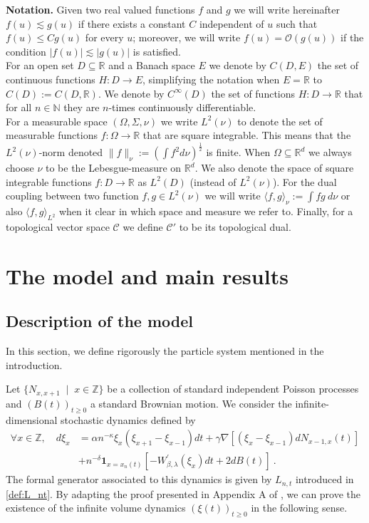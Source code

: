 \documentclass[a4paper, reqno, 12pt]{amsart}
\theoremstyle{plain}
\theoremstyle{definition}
\newcommand{\R}{\mathbb{R}}
\newcommand{\N}{\mathbb{N}}
\begin{document}
\bigskip
\textbf{Notation.} 
Given two real valued functions $f$ and $g$ we will write hereinafter $f(u) \lesssim g(u)$ if there exists a constant $C$ independent of $u$ such that $f(u) \le C g(u)$ for every $u$; moreover, we will write $f(u) = \mathcal{O} (g(u) )$ if the condition $|f (u) | \lesssim |g(u) |$ is satisfied. \\
For an open set $D\subseteq \R$ and a Banach space $E$ we denote by $C(D, E)$ the set of continuous functions $H:D\to E$, simplifying the notation when $E =\R$ to $C(D):= C(D,\R)$. We denote by $C^{\infty}(D)$ the set of  functions $H:D\to\R$ that for all $n\in\N$ they are $n$-times continuously differentiable.\\
For a measurable space $(\Omega , \Sigma, \nu)$ we  write $L^2(\nu)$ to denote the set of measurable functions $f:\Omega \to \R$ that are square integrable.
This means that the $L^2(\nu)$-norm denoted $\|f\|_{\nu}:=\left( \int f^2 d\nu\right)^{\frac{1}{2}}$ is finite. When $\Omega \subseteq \R^d$ we always choose $\nu$ to be the Lebesgue-measure on $\R^d$. We also denote the space of square integrable functions $f:D\to\R$ as $L^2(D)$ (instead of $L^2(\nu)$). For the dual coupling between two function $f,g\in L^2(\nu)$ we will write $\langle f,g\rangle_{\nu}:= \int fg \ d\nu$ or also $\langle f,g\rangle_{L^2}$ when it clear in which space and measure we refer to. 
Finally, for a topological vector space $\mathcal C$ we define $\mathcal C'$ to be its topological dual.



\section{The model and main results} \label{sec:modelandmainresults}

\subsection{Description of the model}


In this section, we define rigorously the particle system mentioned in the introduction. 


Let $\{ {N}_{x,x+1} \; \mid \; x \in \mathbb Z\}$ be a collection of standard independent Poisson processes and $(B(t))_{t \ge 0}$ a standard Brownian motion. We consider the infinite-dimensional stochastic dynamics defined by 
\begin{equation}
\label{eq:app-stoch-eq}
\begin{split}
\forall x \in \mathbb Z, \quad {d \xi_x} &=  \alpha n^{-\kappa} \xi_x (\xi_{x+1} -\xi_{x-1}) dt + \gamma \nabla \left[ (\xi_{x} -\xi_{x-1}) dN_{x-1,x} (t)\right]\\
&+ n^{-\delta} {\mathbf 1}_{x=x_n (t)} \left[ -W^{\prime}_{\beta, \lambda} (\xi_x) dt + 2 dB (t) \right]  \ .
\end{split}
\end{equation}
The formal generator associated to this dynamics is given by $L_{n,t}$ introduced in \eqref{def:L_nt}. By adapting the proof presented in Appendix A of \cite{BG14}, we can prove the existence of the infinite volume dynamics $(\xi(t))_{t\ge 0}$ in the following sense.
\bigskip
\end{document}

